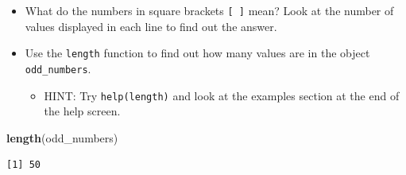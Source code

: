 \documentclass[]{article}
\newenvironment{Shaded}{\begin{snugshade}}{\end{snugshade}}
\newcommand{\KeywordTok}[1]{\textcolor[rgb]{0.13,0.29,0.53}{\textbf{#1}}}
\newcommand{\NormalTok}[1]{#1}
\providecommand{\tightlist}{%
  \setlength{\itemsep}{0pt}\setlength{\parskip}{0pt}}
\begin{document}
\begin{itemize}
\item
  What do the numbers in square brackets \texttt{{[}\ {]}} mean? Look at the number of values displayed in each line to find out the answer.
\item
  Use the \texttt{length} function to find out how many values are in the object \texttt{odd\_numbers}.

  \begin{itemize}
  \tightlist
  \item
    HINT: Try \texttt{help(length)} and look at the examples section at the end of the help screen.
  \end{itemize}
\end{itemize}

\begin{Shaded}
\begin{Highlighting}[]
\KeywordTok{length}\NormalTok{(odd_numbers)}
\end{Highlighting}
\end{Shaded}

\begin{verbatim}
[1] 50
\end{verbatim}
\end{document}

